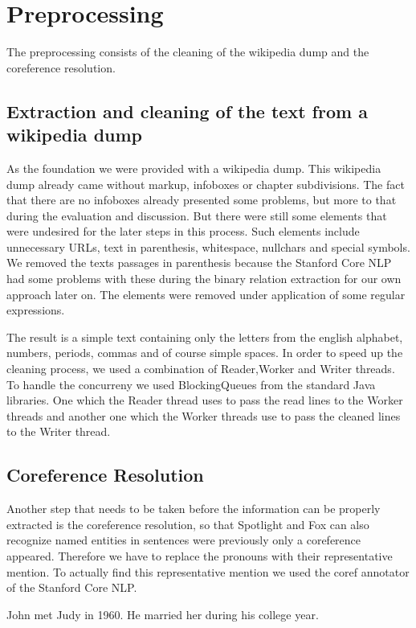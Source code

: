 \documentclass[runningheads]{llncs}
\begin{document}
\section{Preprocessing}
The preprocessing consists of the cleaning of the wikipedia dump and the coreference resolution.
\subsection{Extraction and cleaning of the text from a wikipedia dump}
As the foundation we were provided with a wikipedia dump. This wikipedia dump already came without markup, infoboxes 
or chapter subdivisions. The fact that there are no infoboxes already presented some problems, but more to that during the evaluation and discussion. But there were still some elements that were undesired for the later steps in this process. Such elements include unnecessary URLs, text in parenthesis, whitespace, nullchars and special symbols. We removed the texts passages in parenthesis because the Stanford Core NLP had some problems with these during the binary relation extraction for our own approach later on. The elements were removed under application of some regular expressions. 
\pagebreak

The result is a simple text containing only the letters from the english alphabet, numbers, periods, commas and of course simple spaces. In order to speed up the cleaning process, we used a combination of Reader,Worker and Writer threads. To handle the concurreny we used BlockingQueues from the standard Java libraries. One which the Reader thread uses to pass the read lines to the Worker threads and another one which the Worker threads use to pass the cleaned lines to the Writer thread.


\subsection{Coreference Resolution}
Another step that needs to be taken before the information can be properly extracted is the coreference resolution, so that Spotlight and Fox can also recognize named entities in sentences were previously only a coreference appeared. Therefore we have to replace the pronouns with their representative mention. To actually find this representative mention we used the coref annotator \cite{coref} of the Stanford Core NLP.  

\begin{example} John met Judy in 1960. He married her during his college year.\end{example}
\end{document}
